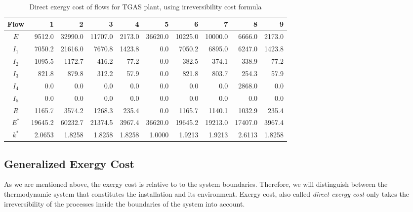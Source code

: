 \documentclass{ecos2018}
\begin{document}
\begin{table}[htbp]
	\small
	\caption{Direct exergy cost of flows for TGAS plant, using irreversibility cost formula}
	\begin{tabular}{crrrrrrrrr}
		\toprule
		Flow & 1 & 2 & 3 & 4 & 5 & 6 & 7 & 8 & 9 \\
		\midrule
		$E$     & 9512.0 & 32990.0 & 11707.0 & 2173.0 & 36620.0 & 10225.0 & 10000.0 & 6666.0 & 2173.0 \\
		\midrule
		$I_1$    & 7050.2 & 21616.0 & 7670.8 & 1423.8 & 0.0   & 7050.2 & 6895.0 & 6247.0 & 1423.8 \\
		$I_2$    & 1095.5 & 1172.7 & 416.2 & 77.2  & 0.0   & 382.5 & 374.1 & 338.9 & 77.2 \\
		$I_3$    & 821.8 & 879.8 & 312.2 & 57.9  & 0.0   & 821.8 & 803.7 & 254.3 & 57.9 \\
		$I_4$    & 0.0   & 0.0   & 0.0   & 0.0   & 0.0   & 0.0   & 0.0   & 2868.0 & 0.0 \\
		$I_5$    & 0.0   & 0.0   & 0.0   & 0.0   & 0.0   & 0.0   & 0.0   & 0.0   & 0.0 \\
		$R$     & 1165.7 & 3574.2 & 1268.3 & 235.4 & 0.0   & 1165.7 & 1140.1 & 1032.9 & 235.4 \\
		\midrule
		$E^*$ & 19645.2 & 60232.7 & 21374.5 & 3967.4 & 36620.0 & 19645.2 & 19213.0 & 17407.0 & 3967.4 \\
		\midrule
		$k^*$ & 2.0653  & 1.8258	& 1.8258  &	1.8258 & 1.0000	& 1.9213 & 1.9213 & 2.6113 & 1.8258 \\
		\bottomrule
	\end{tabular}%
	\label{tab4}%
\end{table}%

\subsection{Generalized Exergy Cost}
As we are mentioned above, the exergy cost is relative to  to the system boundaries.
Therefore, we will distinguish between the thermodynamic system that constitutes the installation and its environment. Exergy cost, also called \emph{direct exergy cost} only takes the irreversibility of the processes inside the boundaries of the system into account. 
\end{document}
